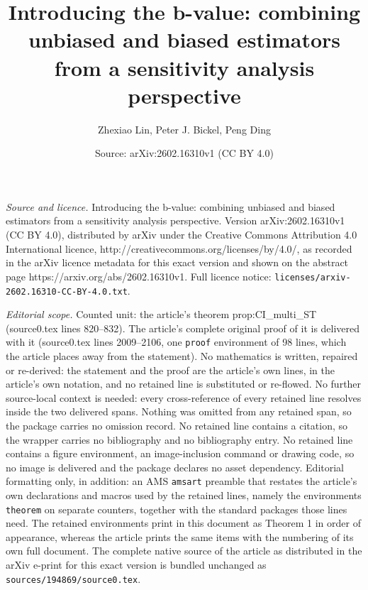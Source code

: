 \documentclass[10pt,a4paper]{amsart}
\title{\LARGE Introducing the b-value: combining unbiased and biased estimators from a sensitivity analysis perspective}
\author{Zhexiao Lin, Peter J. Bickel, Peng Ding}
\date{Source: arXiv:2602.16310v1 (CC BY 4.0)}
\begin{document}
\maketitle

\noindent\emph{Source and licence.} \LARGE Introducing the b-value: combining unbiased and biased estimators from a sensitivity analysis perspective. Version arXiv:2602.16310v1 (CC BY 4.0), distributed by arXiv under the Creative Commons Attribution 4.0 International licence, http://creativecommons.org/licenses/by/4.0/, as recorded in the arXiv licence metadata for this exact version and shown on the abstract page https://arxiv.org/abs/2602.16310v1. Full licence notice: \texttt{licenses/arxiv-2602.16310-CC-BY-4.0.txt}.\par\smallskip

\noindent\textit{Editorial scope.} Counted unit: the article's theorem prop:CI\_multi\_ST (source0.tex lines 820--832). The article's complete original proof of it is delivered with it (source0.tex lines 2009--2106, one \texttt{proof} environment of 98 lines, which the article places away from the statement). No mathematics is written, repaired or re-derived: the statement and the proof are the article's own lines, in the article's own notation, and no retained line is substituted or re-flowed.  No further source-local context is needed: every cross-reference of every retained line resolves inside the two delivered spans.  Nothing was omitted from any retained span, so the package carries no omission record.  No retained line contains a citation, so the wrapper carries no bibliography and no bibliography entry.  No retained line contains a figure environment, an image-inclusion command or drawing code, so no image is delivered and the package declares no asset dependency.  Editorial formatting only, in addition: an AMS \texttt{amsart} preamble that restates the article's own declarations and macros used by the retained lines, namely the environments \texttt{theorem} on separate counters, together with the standard packages those lines need.  The retained environments print in this document as Theorem 1 in order of appearance, whereas the article prints the same items with the numbering of its own full document.  The complete native source of the article as distributed in the arXiv e-print for this exact version is bundled unchanged as \texttt{sources/194869/source0.tex}.
\end{document}
